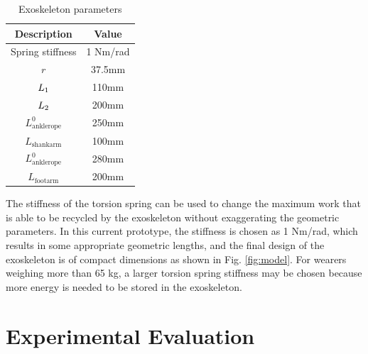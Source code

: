 \documentclass[twocolumn,cleanfoot,10pt]{asme2ej}
\begin{document}


\begin{table}[t]
	\caption{Exoskeleton parameters}
	\begin{center}
		\label{tab:Exoskeleton parameters}
		\begin{tabular}{c c}	
			\hline
			\textbf{Description } & \textbf{Value} \\
			\hline
			Spring stiffness & 1 Nm/rad\\
			$r$ & 37.5mm\\
			$L_\textrm1$ & 110mm\\
			$L_\textrm2$ & 200mm\\
			$L_\textrm{anklerope}^0$ & 250mm\\
			$L_\textrm{shankarm}$  & 100mm\\
			$L_\textrm{anklerope}^0$ & 280mm\\
			$L_\textrm{footarm}$ & 200mm\\
			\hline
		\end{tabular}
	\end{center}
\end{table}


The stiffness of the torsion spring can be used to change the maximum work that is able to be recycled by the exoskeleton without exaggerating the geometric parameters.
In this current prototype, the stiffness is chosen as 1 Nm/rad, which results in some appropriate geometric lengths, and the final design of the exoskeleton is of compact dimensions as shown in Fig. \ref{fig:model}.
For wearers weighing more than 65 kg, a larger torsion spring stiffness may be chosen because more energy is needed to be stored in the exoskeleton.

\section{Experimental Evaluation}
\label{sec:experiment}
\end{document}
